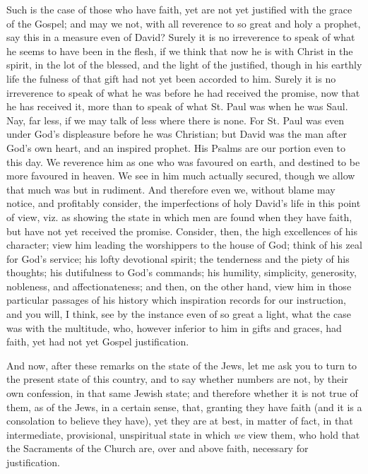 Such is the case of those who have faith, yet are not yet justified
with the grace of the Gospel; and may we not, with all reverence to so
great and holy a prophet, say this in a measure even of David? Surely
it is no irreverence to speak of what he seems to have been in the
flesh, if we think that now he is with Christ in the spirit, in the
lot of the blessed, and the light of the justified, though in his
earthly life the fulness of that gift had not yet been accorded to
him. Surely it is no irreverence to speak of what he was before he had
received the promise, now that he has received it, more than to speak
of what St. Paul was when he was Saul. Nay, far less, if we may talk
of less where there is none. For St. Paul was even under God's
displeasure before he was Christian; but David was the man after God's
own heart, and an inspired prophet. His Psalms are our portion even to
this day. We reverence him as one who was favoured on earth, and
destined to be more favoured in heaven. We see in him much actually
secured, though we allow that much was but in rudiment. And therefore
even we, without blame may notice, and profitably consider, the
imperfections of holy David's life in this point of view, viz. as
showing the state in which men are found when they have faith, but
have not yet received the promise. Consider, then, the high
excellences of his character; view him leading the worshippers to the
house of God; think of his zeal for God's service; his lofty
devotional spirit; the tenderness and the piety of his thoughts; his
dutifulness to God's commands; his humility, simplicity, generosity,
nobleness, and affectionateness; and then, on the other hand, view him
in those particular passages of his history which inspiration records
for our instruction, and you will, I think, see by the instance even
of so great a light, what the case was with the multitude, who,
however inferior to him in gifts and graces, had faith, yet had not
yet Gospel justification.

And now, after these remarks on the state of the Jews, let me ask
you to turn to the present state of this country, and to say whether
numbers are not, by their own confession, in that same Jewish state;
and therefore whether it is not true of them, as of the Jews, in a
certain sense, that, granting they have faith (and it is a consolation
to believe they have), yet they are at best, in matter of fact, in
that intermediate, provisional, unspiritual state in which \emph{we}
view them, who hold that the Sacraments of the Church are, over and
above faith, necessary for justification.

